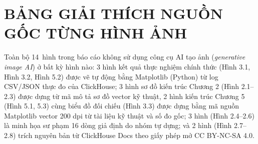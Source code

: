 \documentclass[13pt,a4paper]{report}
\begin{document}
\appendix
{}

\chapter{BẢNG GIẢI THÍCH NGUỒN GỐC TỪNG HÌNH ẢNH}

Toàn bộ 14~hình trong báo cáo không sử dụng công cụ AI tạo ảnh (\textit{generative image AI}) ở bất kỳ hình nào: 3 hình kết quả thực nghiệm chính thức (Hình 3.1, Hình 3.2, Hình 5.2) được vẽ tự động bằng Matplotlib (Python) từ log CSV/JSON thực đo của ClickHouse; 3 hình sơ đồ kiến trúc Chương 2 (Hình 2.1--2.3) được dựng từ mã mô tả sơ đồ vector kỹ thuật, 2 hình kiến trúc Chương 5 (Hình 5.1, 5.3) cùng biểu đồ đối chiếu (Hình 3.3) được dựng bằng mã nguồn Matplotlib vector 200 dpi từ tài liệu kỹ thuật và số đo gốc; 3 hình (Hình 2.4--2.6) là minh họa sư phạm 16 dòng giả định do nhóm tự dựng; và 2 hình (Hình 2.7--2.8) trích nguyên bản từ ClickHouse Docs theo giấy phép mở CC BY-NC-SA 4.0.
\end{document}

